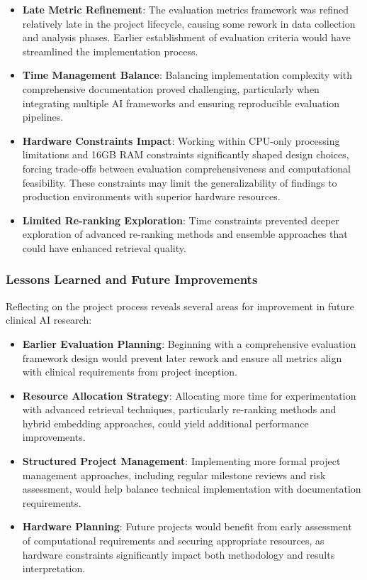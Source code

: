 \begin{itemize}
    \item \textbf{Late Metric Refinement}: The evaluation metrics framework was refined relatively late in the project lifecycle, causing some rework in data collection and analysis phases. Earlier establishment of evaluation criteria would have streamlined the implementation process.
    
    \item \textbf{Time Management Balance}: Balancing implementation complexity with comprehensive documentation proved challenging, particularly when integrating multiple AI frameworks and ensuring reproducible evaluation pipelines.
    
    \item \textbf{Hardware Constraints Impact}: Working within CPU-only processing limitations and 16GB RAM constraints significantly shaped design choices, forcing trade-offs between evaluation comprehensiveness and computational feasibility. These constraints may limit the generalizability of findings to production environments with superior hardware resources.
    
    \item \textbf{Limited Re-ranking Exploration}: Time constraints prevented deeper exploration of advanced re-ranking methods and ensemble approaches that could have enhanced retrieval quality.
\end{itemize}

\subsubsection{Lessons Learned and Future Improvements}

Reflecting on the project process reveals several areas for improvement in future clinical AI research:

\begin{itemize}
    \item \textbf{Earlier Evaluation Planning}: Beginning with a comprehensive evaluation framework design would prevent later rework and ensure all metrics align with clinical requirements from project inception.
    
    \item \textbf{Resource Allocation Strategy}: Allocating more time for experimentation with advanced retrieval techniques, particularly re-ranking methods and hybrid embedding approaches, could yield additional performance improvements.
    
    \item \textbf{Structured Project Management}: Implementing more formal project management approaches, including regular milestone reviews and risk assessment, would help balance technical implementation with documentation requirements.
    
    \item \textbf{Hardware Planning}: Future projects would benefit from early assessment of computational requirements and securing appropriate resources, as hardware constraints significantly impact both methodology and results interpretation.
\end{itemize}

